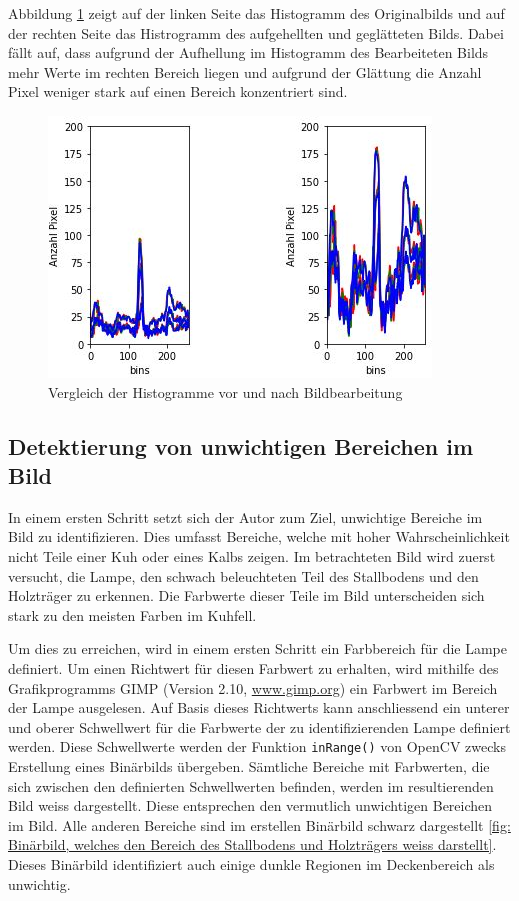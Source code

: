 Abbildung \ref{fig: Vergleich der Histogramme vor und nach Bildbearbeitung} zeigt auf der linken Seite das Histogramm des Originalbilds und auf der rechten Seite das Histrogramm des aufgehellten und geglätteten Bilds. Dabei fällt auf, dass aufgrund der Aufhellung im Histogramm des Bearbeiteten Bilds mehr Werte im rechten Bereich liegen und aufgrund der Glättung die Anzahl Pixel weniger stark auf einen Bereich konzentriert sind.

\begin{figure}[H]
	\center
	\includegraphics[scale=0.9]{Grafiken/entwicklung/2HistrogrammVergleich.jpg}
	\caption{Vergleich der Histogramme vor und nach Bildbearbeitung} 
	\label{fig: Vergleich der Histogramme vor und nach Bildbearbeitung}
\end{figure}

\subsection{Detektierung von unwichtigen Bereichen im Bild}
In einem ersten Schritt setzt sich der Autor zum Ziel, unwichtige Bereiche im Bild zu identifizieren. Dies umfasst Bereiche, welche mit hoher Wahrscheinlichkeit nicht Teile einer Kuh oder eines Kalbs zeigen. Im betrachteten Bild wird zuerst versucht, die Lampe, den schwach beleuchteten Teil des Stallbodens und den Holzträger zu erkennen. Die Farbwerte dieser Teile im Bild unterscheiden sich stark zu den meisten Farben im Kuhfell.

Um dies zu erreichen, wird in einem ersten Schritt ein Farbbereich für die Lampe definiert. Um einen Richtwert für diesen Farbwert zu erhalten, wird mithilfe des Grafikprogramms GIMP (Version 2.10, \url{www.gimp.org}) ein Farbwert im Bereich der Lampe ausgelesen. Auf Basis dieses Richtwerts kann anschliessend ein unterer und oberer Schwellwert für die Farbwerte der zu identifizierenden Lampe definiert werden. Diese Schwellwerte werden der Funktion \texttt{inRange()} von OpenCV zwecks Erstellung eines Binärbilds übergeben. Sämtliche Bereiche mit Farbwerten, die sich zwischen den definierten Schwellwerten befinden, werden im resultierenden Bild weiss dargestellt. Diese entsprechen den vermutlich unwichtigen Bereichen im Bild. Alle anderen Bereiche sind im erstellen Binärbild schwarz dargestellt \ref{fig: Binärbild, welches den Bereich des Stallbodens und Holzträgers weiss darstellt}. Dieses Binärbild identifiziert auch einige dunkle Regionen im Deckenbereich als unwichtig.


